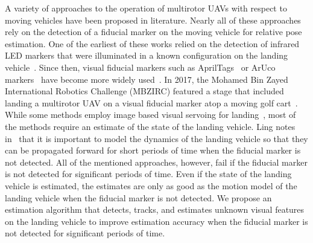 A variety of approaches to the operation of multirotor UAVs with respect to
moving vehicles have been proposed in literature. Nearly all of these approaches rely on the
detection of a fiducial marker on the moving vehicle for relative pose
estimation. One of the earliest of
these works relied on the detection of infrared LED markers that were
illuminated in a known configuration on the landing
vehicle~\cite{wenzel2011automatic}. Since then, visual fiducial markers such as
AprilTags~\cite{olson2011tags} or ArUco markers~\cite{garrido2016generation}
have become more widely
used~\cite{ling2014precision,borowczyk2017autonomous,marantos2018vision,
araar2017vision}.
In 2017, the Mohamed Bin Zayed International Robotics Challenge (MBZIRC)
featured a stage that included landing a multirotor UAV on a visual fiducial
marker atop a moving golf
cart~\cite{baca2019autonomous,falanga2017vision,beul2017fast,cantelli2017autonomous}.
While some methods employ image based visual servoing for
landing~\cite{lee2012autonomous,wynn2019visual}, most of the methods
require an estimate of the state of the landing vehicle.
Ling notes in~\cite{ling2014precision} that it is important to model the
dynamics of the landing vehicle so that they can be propagated forward for short
periods of time when the fiducial marker is not
detected. All of the mentioned
approaches, however, fail if the fiducial marker is not detected for
significant periods of time.
Even if the state of the landing vehicle is estimated, the estimates are only as
good as the
motion model of the landing vehicle when the fiducial marker is not detected. We propose an estimation algorithm that detects,
tracks, and estimates unknown visual features on the landing vehicle to improve
estimation accuracy when the fiducial marker is not detected for significant
periods of time.

